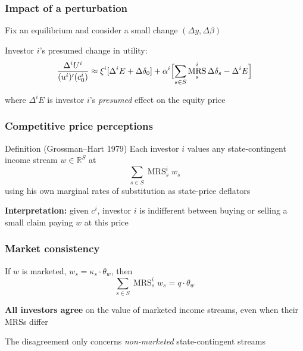 \documentclass[blue]{beamer}
\def\R{\mathbb{R}}
\DeclareMathOperator\MRS{MRS}
\theoremstyle{definition}
\theoremstyle{example}
\begin{document}
\begin{frame}\frametitle{Impact of a perturbation}
Fix an equilibrium and consider a small change $(\Delta y, \Delta \beta)$
\bigskip

Investor $i$'s presumed change in utility:
\begin{equation*}
\frac{\Delta^i U^i}{(u^i)'(c^i_0)} \approx \xi^i [\Delta^i E + \Delta \delta_0]
+ \alpha^i \Bigl[ \sum_{s \in S} \MRS^i_s \Delta \delta_s - \Delta^i E \Bigr]
\end{equation*}
\bigskip

where $\Delta^i E$ is investor $i$'s \emph{presumed} effect on the equity price
\end{frame}

\begin{frame}\frametitle{Competitive price perceptions}
\begin{block}{Definition (Grossman--Hart 1979)}
Each investor $i$ values any state-contingent income stream $w \in \R^S$ at
\begin{equation*}
\sum_{s \in S} \MRS^i_s w_s
\end{equation*}
using his own marginal rates of substitution as state-price deflators
\end{block}
\bigskip

\textbf{Interpretation:} given $c^i$, investor $i$ is indifferent between buying or selling a small claim paying $w$ at this price
\end{frame}

\begin{frame}\frametitle{Market consistency}
If $w$ is marketed, $w_s = \kappa_s \cdot \theta_w$, then
\begin{equation*}
\sum_{s \in S} \MRS^i_s w_s = q \cdot \theta_w
\end{equation*}
\bigskip

\textbf{All investors agree} on the value of marketed income streams, even when their MRSs differ
\bigskip

The disagreement only concerns \emph{non-marketed} state-contingent streams
\end{frame}
\end{document}
